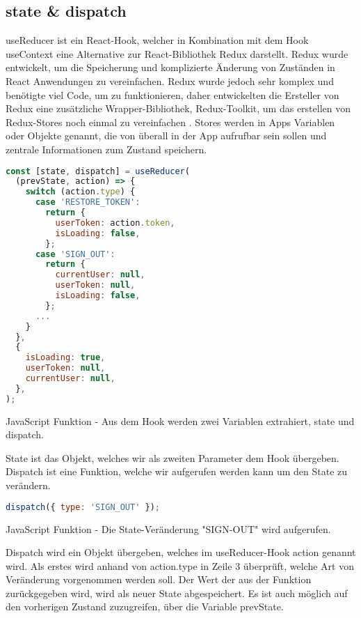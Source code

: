 \subsection{state \& dispatch}
useReducer ist ein React-Hook, welcher in Kombination mit dem Hook useContext eine Alternative zur
React-Bibliothek Redux darstellt. Redux wurde entwickelt, um die Speicherung und komplizierte
Änderung von Zuständen in React Anwendungen zu vereinfachen. Redux wurde jedoch sehr komplex und
benötigte viel Code, um zu funktionieren, daher entwickelten die Ersteller von Redux eine
zusätzliche Wrapper-Bibliothek, Redux-Toolkit, um das erstellen von Redux-Stores noch einmal zu
vereinfachen \cite{reduxToolkit}. Stores werden in Apps Variablen oder Objekte genannt, die von
überall in der App aufrufbar sein sollen und zentrale Informationen zum Zustand speichern.

\begin{code}[htp]
\begin{lstlisting}[firstnumber=1,language=JavaScript, style=JSX]
const [state, dispatch] = useReducer(
  (prevState, action) => {
    switch (action.type) {
      case 'RESTORE_TOKEN':
        return {
          userToken: action.token,
          isLoading: false,
        };
      case 'SIGN_OUT':
        return {
          currentUser: null,
          userToken: null,
          isLoading: false,
        };
      ...
    }
  },
  {
    isLoading: true,
    userToken: null,
    currentUser: null,
  },
);
\end{lstlisting}
\caption{JavaScript Funktion - Aus dem Hook werden zwei Variablen extrahiert, state und dispatch.}
\end{code}

State ist das Objekt, welches wir als zweiten Parameter dem Hook übergeben. Dispatch ist eine
Funktion, welche wir aufgerufen werden kann um den State zu verändern.

\newpage

\begin{code}[htp]
\begin{lstlisting}[firstnumber=1,language=JavaScript, style=JSX]
dispatch({ type: 'SIGN_OUT' });
\end{lstlisting}
\caption{JavaScript Funktion - Die State-Veränderung "SIGN-OUT" wird aufgerufen.}
\end{code}

Dispatch wird ein Objekt übergeben, welches im useReducer-Hook action genannt wird. Als erstes wird
anhand von action.type in Zeile 3 überprüft, welche Art von Veränderung vorgenommen werden soll.
Der Wert der aus der Funktion zurückgegeben wird, wird als neuer State abgespeichert. Es ist auch
möglich auf den vorherigen Zustand zuzugreifen, über die Variable prevState.
